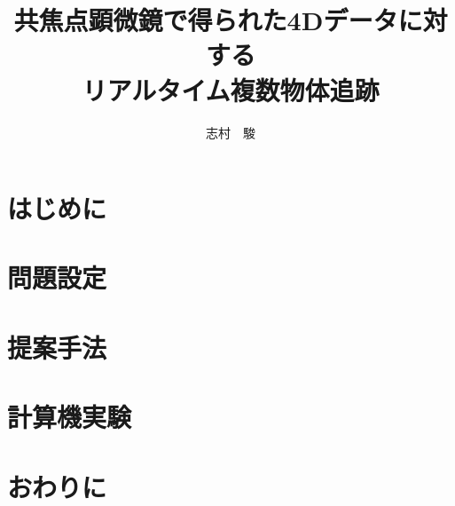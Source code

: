 \documentclass[11pt]{jsbook}
\title{共焦点顕微鏡で得られた4Dデータに対する\\リアルタイム複数物体追跡}
\author{志村　駿}
\begin{document}
    \maketitle
    \cleardoublepage %
    \tableofcontents
    \thispagestyle{fancy2}
    \listoffigures %
    \thispagestyle{fancy2}
    \listoftables %
    \thispagestyle{fancy2}
    \cleardoublepage %


    \chapter{はじめに}
    \label{chap:introduction}
    

    \chapter{問題設定}
    \label{chap:setting}
    

    \chapter{提案手法}
    \label{chap:proposed}
    

    \chapter{計算機実験}
    \label{chap:experiment}
    

    \chapter{おわりに}
    \label{chap:conclusion}
    

    
    
\end{document}
